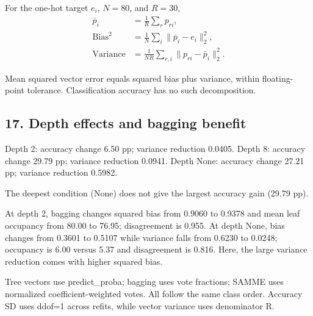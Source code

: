 \documentclass[10pt,twocolumn,letterpaper]{article}
\begin{document}
For the one-hot target $e_i$, $N=80$, and $R=30$,
\begin{align*}
\bar p_i &= \frac{1}{R}\sum_r p_{ri},\\
\mathrm{Bias}^2 &= \frac1N\sum_i\|\bar p_i-e_i\|_2^2,\\
\mathrm{Variance} &= \frac1{NR}\sum_{r,i}\|p_{ri}-\bar p_i\|_2^2.
\end{align*}

Mean squared vector error equals squared bias plus variance, within floating-point tolerance. Classification accuracy has no such decomposition.

\newpage
\subsection*{17. Depth effects and bagging benefit}
Depth 2: accuracy change 6.50 pp; variance reduction 0.0405. Depth 8: accuracy change 29.79 pp; variance reduction 0.0941. Depth None: accuracy change 27.21 pp; variance reduction 0.5982.

The deepest condition (None) does not give the largest accuracy gain (29.79 pp).

At depth 2, bagging changes squared bias from 0.9060 to 0.9378 and mean leaf occupancy from 80.00 to 76.95; disagreement is 0.955. At depth None, bias changes from 0.3601 to 0.5107 while variance falls from 0.6230 to 0.0248; occupancy is 6.00 versus 5.37 and disagreement is 0.816. Here, the large variance reduction comes with higher squared bias.

Tree vectors use predict\_proba; bagging uses vote fractions; SAMME uses normalized coefficient-weighted votes. All follow the same class order. Accuracy SD uses ddof=1 across refits, while vector variance uses denominator R.

\clearpage
{}
\end{document}
